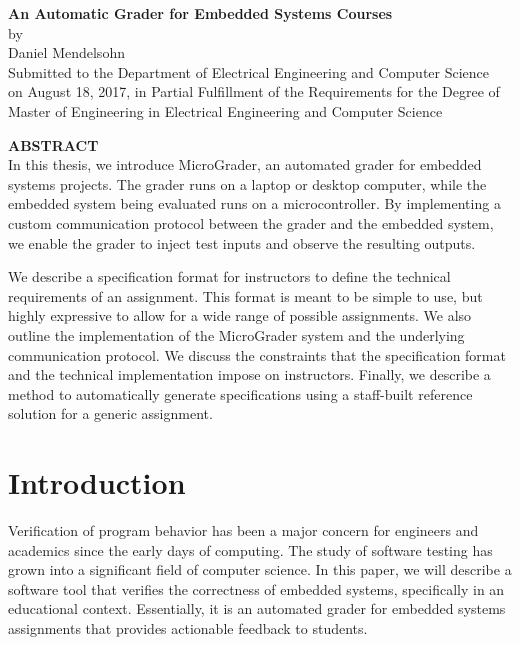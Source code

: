 \documentclass[12pt]{article}
\newcommand{\mytitle}{\textbf{An Automatic Grader for Embedded Systems Courses}}
\newcommand{\mydate}{August 18, 2017}
\begin{document}
\addtocounter{page}{1}

\newpage
\mbox{}
\newpage

\begin{center}
\mytitle \\
by \\
Daniel Mendelsohn \\
\vspace{12pt}
Submitted to the Department of Electrical Engineering and Computer Science\\
 on \mydate{}, in Partial Fulfillment of the Requirements for the Degree of\\
 Master of Engineering in Electrical Engineering and Computer Science
\end{center}
\vspace{12pt}
\textbf{ABSTRACT} \\

\noindent In this thesis, we introduce MicroGrader, an automated grader for embedded systems projects.  The grader runs on a laptop or desktop computer, while the embedded system being evaluated runs on a microcontroller.  By implementing a custom communication protocol between the grader and the embedded system, we enable the grader to inject test inputs and observe the resulting outputs.

We describe a specification format for instructors to define the technical requirements of an assignment.  This format is meant to be simple to use, but highly expressive to allow for a wide range of possible assignments.  We also outline the implementation of the MicroGrader system and the underlying communication protocol.  We discuss the constraints that the specification format and the technical implementation impose on instructors.  Finally, we describe a method to automatically generate specifications using a staff-built reference solution for a generic assignment. 

\newpage
\mbox{}
\newpage

\tableofcontents

\doublespacing

\newpage
\section{Introduction}
Verification of program behavior has been a major concern for engineers and academics since the early days of computing.  The study of software testing has grown into a significant field of computer science.  In this paper, we will describe a software tool that verifies the correctness of embedded systems, specifically in an educational context.  Essentially, it is an automated grader for embedded systems assignments that provides actionable feedback to students.
\end{document}
